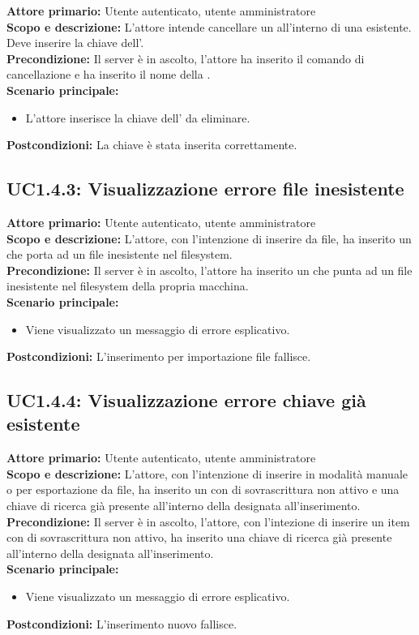 \documentclass{scalatekids-article}
\begin{document}
\textbf{Attore primario:} Utente autenticato, utente amministratore\\
\textbf{Scopo e descrizione:} L'attore intende cancellare un  all'interno di una  esistente. Deve inserire la chiave dell'.\\
\textbf{Precondizione:} Il server è in ascolto, l'attore ha inserito il comando di cancellazione  e ha inserito il nome della .\\
\textbf{Scenario principale:}
\begin{itemize}
\item L'attore inserisce la chiave dell' da eliminare.
\end{itemize}
\textbf{Postcondizioni:} La chiave è stata inserita correttamente.

\subsection{UC1.4.3: Visualizzazione errore file inesistente}

\textbf{Attore primario:} Utente autenticato, utente amministratore\\
\textbf{Scopo e descrizione:} L'attore, con l'intenzione di inserire  da file, ha inserito un  che porta ad un file inesistente nel filesystem.\\
\textbf{Precondizione:} Il server è in ascolto, l'attore ha inserito un  che punta ad un file inesistente nel filesystem della propria macchina.\\
\textbf{Scenario principale:}
\begin{itemize}
\item Viene visualizzato un messaggio di errore esplicativo.
\end{itemize}
\textbf{Postcondizioni:} L'inserimento per importazione file fallisce.

\subsection{UC1.4.4: Visualizzazione errore chiave già esistente}

\textbf{Attore primario:} Utente autenticato, utente amministratore\\
\textbf{Scopo e descrizione:} L'attore, con l'intenzione di inserire  in modalità manuale o per esportazione da file, ha inserito un  con  di sovrascrittura
non attivo e una chiave di ricerca già presente all'interno della  designata all'inserimento.\\
\textbf{Precondizione:} Il server è in ascolto, l'attore, con l'intezione di inserire un item con  di sovrascrittura non attivo, ha inserito una chiave di ricerca già presente
all'interno della  designata all'inserimento.\\
\textbf{Scenario principale:}
\begin{itemize}
\item Viene visualizzato un messaggio di errore esplicativo.
\end{itemize}
\textbf{Postcondizioni:} L'inserimento nuovo  fallisce.
\end{document}
